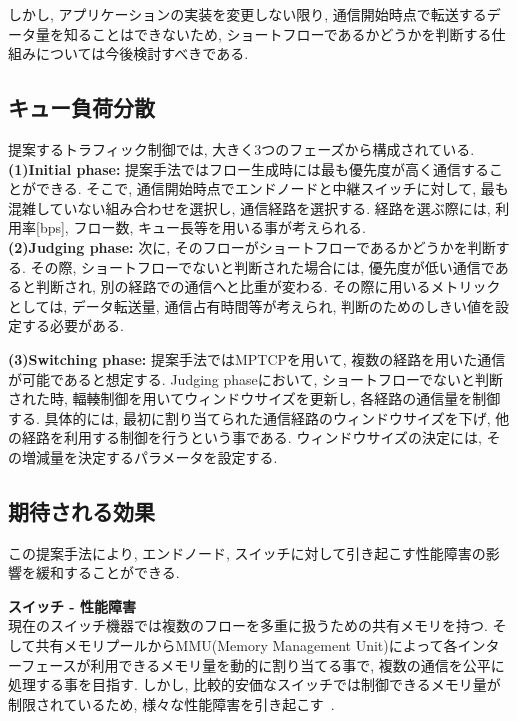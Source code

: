 \documentclass[11pt, a4paper, twocolumn]{jsarticle}
\begin{document}
しかし, アプリケーションの実装を変更しない限り, 通信開始時点で転送するデータ量を知ることはできないため,
ショートフローであるかどうかを判断する仕組みについては今後検討すべきである.



\subsection{キュー負荷分散}
\label{sec:load_balancing_mechanism}
提案するトラフィック制御では, 大きく3つのフェーズから構成されている. \\
{\bf (1)Initial phase: }
提案手法ではフロー生成時には最も優先度が高く通信することができる.
そこで, 通信開始時点でエンドノードと中継スイッチに対して, 最も混雑していない組み合わせを選択し, 通信経路を選択する.
経路を選ぶ際には, 利用率[bps], フロー数, キュー長等を用いる事が考えられる. \\
{\bf (2)Judging phase: }
次に, そのフローがショートフローであるかどうかを判断する.
その際, ショートフローでないと判断された場合には, 優先度が低い通信であると判断され, 別の経路での通信へと比重が変わる.
その際に用いるメトリックとしては, データ転送量, 通信占有時間等が考えられ, 判断のためのしきい値を設定する必要がある.

{\bf (3)Switching phase: }
提案手法ではMPTCPを用いて, 複数の経路を用いた通信が可能であると想定する.
Judging phaseにおいて, ショートフローでないと判断された時, 輻輳制御を用いてウィンドウサイズを更新し, 各経路の通信量を制御する.
具体的には, 最初に割り当てられた通信経路のウィンドウサイズを下げ, 他の経路を利用する制御を行うという事である.
ウィンドウサイズの決定には, その増減量を決定するパラメータを設定する.

\subsection{期待される効果}
\label{sec:expected_effect}
この提案手法により, エンドノード, スイッチに対して引き起こす性能障害の影響を緩和することができる.

{\bf スイッチ - 性能障害}\\
現在のスイッチ機器では複数のフローを多重に扱うための共有メモリを持つ.
そして共有メモリプールからMMU(Memory Management Unit)によって各インターフェースが利用できるメモリ量を動的に割り当てる事で,
複数の通信を公平に処理する事を目指す.
しかし, 比較的安価なスイッチでは制御できるメモリ量が制限されているため,
様々な性能障害を引き起こす~\cite{flexible}.
\end{document}
